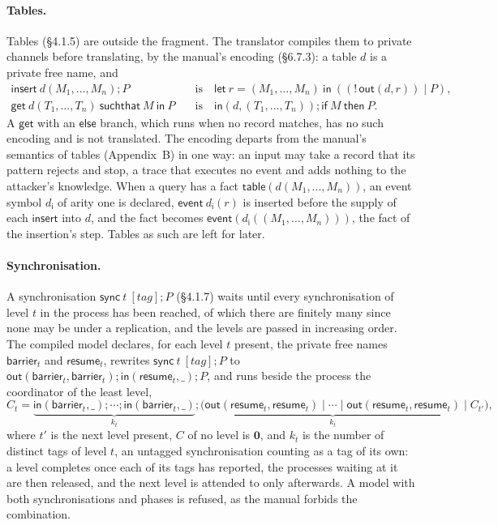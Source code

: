 \documentclass[11pt]{article}
\theoremstyle{definition}
\theoremstyle{plain}
\theoremstyle{remark}
\begin{document}
\paragraph{Tables.} Tables (\S4.1.5) are outside the fragment. The translator compiles them to private channels before translating, by the manual's encoding (\S6.7.3): a table $d$ is a private free name, and
\begin{align*}
\mathsf{insert}\ d(M_1,\dots,M_n);P\quad&\text{is}\quad\mathsf{let}\ r=(M_1,\dots,M_n)\ \mathsf{in}\ ((!\,\mathsf{out}(d,r))\mid P),\\
\mathsf{get}\ d(T_1,\dots,T_n)\ \mathsf{suchthat}\ M\ \mathsf{in}\ P\quad&\text{is}\quad\mathsf{in}(d,(T_1,\dots,T_n));\mathsf{if}\ M\ \mathsf{then}\ P.
\end{align*}
A $\mathsf{get}$ with an $\mathsf{else}$ branch, which runs when no record matches, has no such encoding and is not translated. The encoding departs from the manual's semantics of tables (Appendix~B) in one way: an input may take a record that its pattern rejects and stop, a trace that executes no event and adds nothing to the attacker's knowledge. When a query has a fact $\mathsf{table}(d(M_1,\dots,M_n))$, an event symbol $d_{\mathsf{i}}$ of arity one is declared, $\mathsf{event}\ d_{\mathsf{i}}(r)$ is inserted before the supply of each $\mathsf{insert}$ into $d$, and the fact becomes $\mathsf{event}(d_{\mathsf{i}}((M_1,\dots,M_n)))$, the fact of the insertion's step. Tables as such are left for later.

\paragraph{Synchronisation.} A synchronisation $\mathsf{sync}\ t\ [tag];P$ (\S4.1.7) waits until every synchronisation of level $t$ in the process has been reached, of which there are finitely many since none may be under a replication, and the levels are passed in increasing order. The compiled model declares, for each level $t$ present, the private free names $\mathsf{barrier}_t$ and $\mathsf{resume}_t$, rewrites $\mathsf{sync}\ t\ [tag];P$ to $\mathsf{out}(\mathsf{barrier}_t,\mathsf{barrier}_t);\mathsf{in}(\mathsf{resume}_t,\_);P$, and runs beside the process the coordinator of the least level,
\[
C_t=\underbrace{\mathsf{in}(\mathsf{barrier}_t,\_);\cdots;\mathsf{in}(\mathsf{barrier}_t,\_)}_{k_t};\big(\underbrace{\mathsf{out}(\mathsf{resume}_t,\mathsf{resume}_t)\mid\cdots\mid\mathsf{out}(\mathsf{resume}_t,\mathsf{resume}_t)}_{k_t}\mid C_{t'}\big),
\]
where $t'$ is the next level present, $C$ of no level is $\mathbf{0}$, and $k_t$ is the number of distinct tags of level $t$, an untagged synchronisation counting as a tag of its own: a level completes once each of its tags has reported, the processes waiting at it are then released, and the next level is attended to only afterwards. A model with both synchronisations and phases is refused, as the manual forbids the combination.
\end{document}
